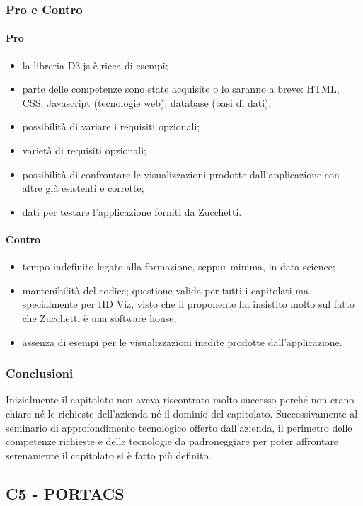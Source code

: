 \subsubsection{Pro e Contro}
\paragraph*{Pro}
\begin{itemize}
\item la libreria D3.js è ricca di esempi;
\item parte delle competenze sono state acquisite o lo saranno a breve: HTML, CSS, Javascript (tecnologie web); database (basi di dati);
\item possibilità di variare i requisiti opzionali;
\item varietà di requisiti opzionali;
\item possibilità di confrontare le visualizzazioni prodotte dall'applicazione con altre già esistenti e corrette;
\item dati per testare l'applicazione forniti da Zucchetti.
\end{itemize}
\paragraph*{Contro}
\begin{itemize}
	\item tempo indefinito legato alla formazione, seppur minima, in data science;
	\item mantenibilità del codice; questione valida per tutti i capitolati ma specialmente per HD Viz, visto che il proponente ha insistito molto sul fatto che Zucchetti è una software house;
	\item assenza di esempi per le visualizzazioni inedite prodotte dall'applicazione. 
\end{itemize}
\subsubsection{Conclusioni}
Inizialmente il capitolato non aveva riscontrato molto successo perché non erano chiare né le richieste dell'azienda né il dominio del capitolato. Successivamente al seminario di approfondimento tecnologico offerto dall'azienda, il perimetro delle competenze richieste e delle tecnologie da padroneggiare per poter affrontare serenamente il capitolato si è fatto più definito.

\subsection{C5 - PORTACS}

